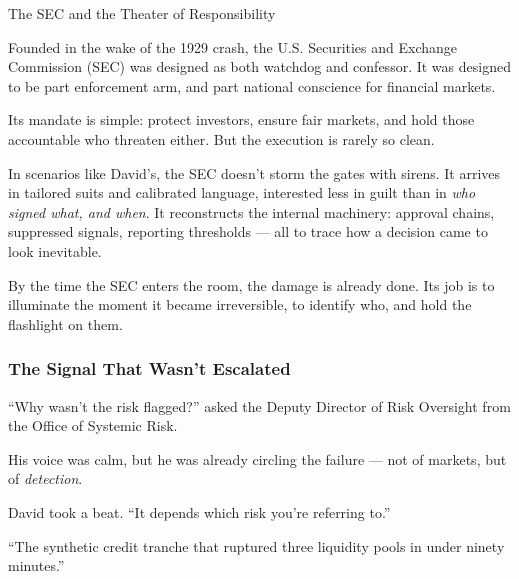 \begin{HistoricalSidebar}{The SEC and the Theater of Responsibility}

  Founded in the wake of the 1929 crash, the U.S. Securities and Exchange Commission (SEC) was designed as both 
  watchdog and confessor. It was designed to be part enforcement arm, and part national conscience for financial markets.

  \medskip
  
  Its mandate is simple: protect investors, ensure fair markets, and hold those accountable who threaten either. 
  But the execution is rarely so clean.

  \medskip
  
  In scenarios like David’s, the SEC doesn't storm the gates with sirens. It arrives in tailored suits and 
  calibrated language, interested less in guilt than in \textit{who signed what, and when}. It reconstructs the internal 
  machinery: approval chains, suppressed signals, reporting thresholds — all to trace how a decision came to look inevitable.

  \medskip
  
  By the time the SEC enters the room, the damage is already done. Its job is to illuminate the moment it became 
  irreversible, to identify who, and hold the flashlight on them.
  
\end{HistoricalSidebar}

\medskip

\subsubsection{The Signal That Wasn't Escalated}

``Why wasn’t the risk flagged?'' asked the Deputy Director of Risk Oversight from the Office of Systemic Risk.

His voice was calm, but he was already circling the failure — not of markets, but of \textit{detection}.

David took a beat. ``It depends which risk you’re referring to.''

``The synthetic credit tranche that ruptured three liquidity pools in under ninety minutes.''

\medskip

